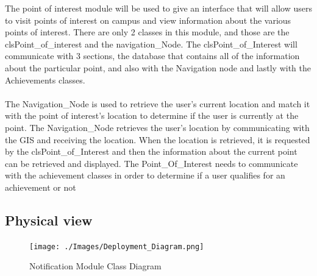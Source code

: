 \documentclass{article}
\begin{document}
{The point of interest module will be used to give an interface that will allow users to visit points of interest on campus and view information about the various points of interest. There are only 2 classes in this module, and those are the clsPoint\_of\_interest and the navigation\_Node. The clsPoint\_of\_Interest will communicate with 3 sections, the database that contains all of the information about the particular point, and also with the Navigation node and lastly with the Achievements classes.\\ \\ The Navigation\_Node is used to retrieve the user's current location and match it with the point of interest's location to determine if the user is currently at the point. The Navigation\_Node retrieves the user's location by communicating with the GIS and receiving the location. When the location is retrieved, it is requested by the clsPoint\_of\_Interest and then the information about the current point can be retrieved and displayed. The Point\_Of\_Interest needs to communicate with the achievement classes in order to determine if a user qualifies for an achievement or not}

		\newpage
		\subsection{Physical view}
	
			\begin{figure}[h]
				\texttt{[image: ./Images/Deployment\_Diagram.png]} 
				\caption{Notification Module Class Diagram}
			\end{figure}
			
\end{document}
